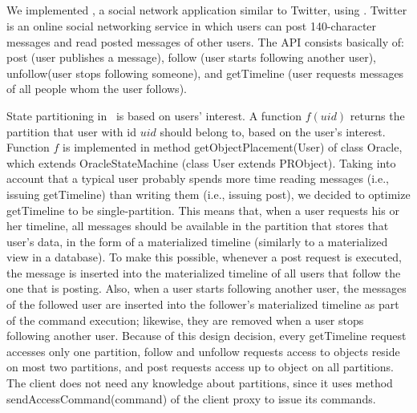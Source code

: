 
\subsection{\appname}

We implemented \appname{}, a social network application similar to Twitter, using \libname{}. Twitter is an online social networking service in which users can post 140-character messages and read posted messages of other users. The API consists basically of: post (user publishes a message), follow (user starts following another user), unfollow(user stops following someone), and getTimeline (user requests messages of all people whom the user follows).

State partitioning in \appname\ is based on users' interest. A function $f(uid)$ returns the partition that user with id $uid$ should belong to, based on the user's interest. Function $f$ is implemented in method getObjectPlacement(User) of class \appname{}Oracle, which extends OracleStateMachine (class User extends PRObject). Taking into account that a typical user probably spends more time reading messages (i.e., issuing getTimeline) than writing them (i.e., issuing post), we decided to optimize getTimeline to be single-partition. This means that, when a user requests his or her timeline, all messages should be available in the partition that stores that user’s data, in the form of a materialized timeline (similarly to a materialized view in a database). To make this possible, whenever a post request is executed, the message is inserted into the materialized timeline of all users that follow the one that is posting. Also, when a user starts following another user, the messages of the followed user are inserted into the follower’s materialized timeline as part of the command execution; likewise, they are removed when a user stops following another user. Because of this design decision, every getTimeline request accesses only one partition, follow and unfollow requests access to objects reside on most two partitions, and post requests access up to object on all partitions. The \appname{} client does not need any knowledge about partitions, since it uses method sendAccessCommand(command) of the \dssmr{} client proxy to issue its commands.

